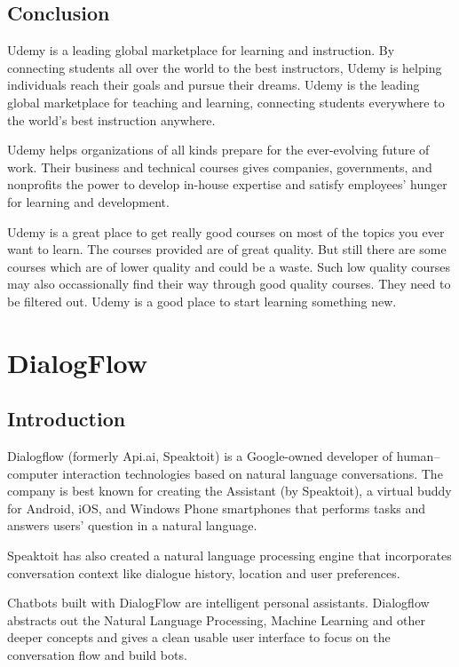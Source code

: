 \subsection{Conclusion}
Udemy is a leading global marketplace for learning and instruction. By connecting students all over the world to the best instructors, Udemy is helping individuals reach their goals and pursue their dreams. Udemy is the leading global marketplace for teaching and learning, connecting students everywhere to the world’s best instruction anywhere.

Udemy helps organizations of all kinds prepare for the ever-evolving future of work. Their business and technical courses gives companies, governments, and nonprofits the power to develop in-house expertise and satisfy employees’ hunger for learning and development.

Udemy is a great place to get really good courses on most of the topics you ever want to learn. The courses provided are of great quality. But still there are some courses which are of lower quality and could be a waste. Such low quality courses may also occassionally find their way through good quality courses. They need to be filtered out. Udemy is a good place to start learning something new.

\section{DialogFlow}
\subsection{Introduction}

Dialogflow (formerly Api.ai, Speaktoit) is a Google-owned developer of human–computer interaction technologies based on natural language conversations. The company is best known for creating the Assistant (by Speaktoit), a virtual buddy for Android, iOS, and Windows Phone smartphones that performs tasks and answers users' question in a natural language.

Speaktoit has also created a natural language processing engine that incorporates conversation context like dialogue history, location and user preferences.

Chatbots built with DialogFlow are intelligent personal assistants. Dialogflow abstracts out the Natural Language Processing, Machine Learning and other deeper concepts and gives a clean usable user interface to focus on the conversation flow and build bots.

